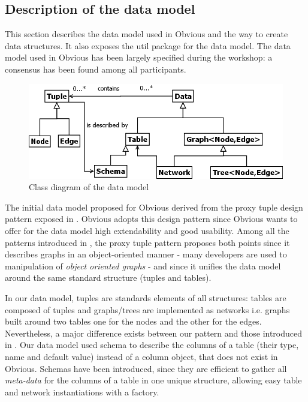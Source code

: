 \subsection{Description of the data model}

This section describes the data model used in Obvious and the way to create data structures. It also exposes the util package for the data model.  The data model used in Obvious has been largely specified during the workshop: a consensus has been found among all participants.

\begin{figure}[!h]
\includegraphics[width=\columnwidth]{figures/obviousdataclass}
\caption{Class diagram of the data model}
\label{fig:datamodel}
\end{figure}

The initial data model proposed for Obvious derived from the proxy tuple design pattern exposed in \cite{DesignPatternsIV}. Obvious adopts this design pattern since Obvious wants to offer for the data model high extendability and good usability. Among all the patterns introduced in \cite{DesignPatternsIV}, the proxy tuple pattern proposes both points since it describes graphs in an object-oriented manner - many developers are used to manipulation of \emph{object oriented graphs} - and since it unifies the data model around the same standard structure (tuples and tables).

In our data model, tuples are standards elements of all structures: tables are composed of tuples and graphs/trees are implemented as networks i.e. graphs built around two tables one for the nodes and the other for the edges. Nevertheless, a major difference exists between our pattern and those introduced in \cite{DesignPatternsIV}. Our data model used schema to describe the columns of a table (their type, name and default value) instead of a column object, that does not exist in Obvious. Schemas have been introduced, since they are efficient to gather all \emph{meta-data} for the columns of a table in one unique structure, allowing easy table and network instantiations with a factory.

